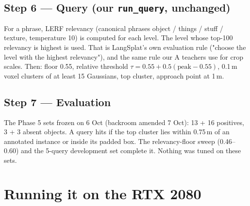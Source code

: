 \documentclass[11pt,a4paper]{article}
\newcommand{\code}[1]{\texttt{\small #1}}
\begin{document}
\subsection*{Step 6 --- Query (our \code{run\_query}, unchanged)}
For a phrase, LERF relevancy (canonical phrases object / things / stuff / texture, temperature 10) is computed for each
level. The level whose top-100 relevancy is highest is used. That is LangSplat's own evaluation rule ("choose the level
with the highest relevancy"), and the same rule our A teachers use for crop scales. Then: floor 0.55, relative threshold
$\tau=0.55+0.5(\text{peak}-0.55)$, 0.1\,m voxel clusters of at least 15 Gaussians, top cluster, approach point at 1\,m.

\subsection*{Step 7 --- Evaluation}
The Phase 5 sets frozen on 6 Oct (backroom amended 7 Oct): 13 + 16 positives, 3 + 3 absent objects. A query hits if the
top cluster lies within 0.75\,m of an annotated instance or inside its padded box. The relevancy-floor sweep (0.46--0.60)
and the 5-query development set complete it. Nothing was tuned on these sets.

\section{Running it on the RTX 2080}
\end{document}

